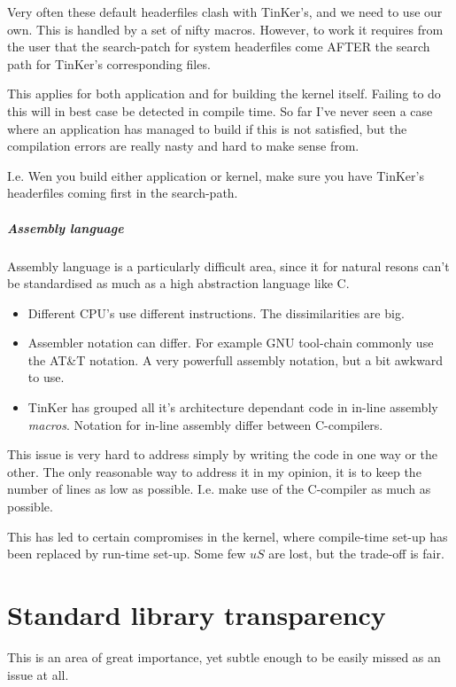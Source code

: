Very often these default headerfiles clash with TinKer's, and we need to use our own. This is handled by a set of nifty macros. However, to work it requires from the user that the search-patch for system headerfiles come AFTER the search path for TinKer's corresponding files. 

This applies for both application and for building the kernel itself. Failing to do this will in best case be detected in compile time. So far I've never seen a case where an application has managed to build if this is not satisfied, but the compilation errors are really nasty and hard to make sense from.

I.e. Wen you build either application or kernel, make sure you have TinKer's headerfiles coming first in the search-path.

\paragraph{Assembly language}
Assembly language is a particularly difficult area, since it for natural resons can't be standardised as much as a high abstraction language like C.

\begin{itemize}
	\item Different CPU's use different instructions. The dissimilarities are big.
	\item Assembler notation can differ. For example GNU tool-chain commonly use the AT\&T notation. A very powerfull assembly notation, but a bit awkward to use.
	\item TinKer has grouped all it's architecture dependant code in in-line assembly \textit{macros}. Notation for in-line assembly differ between C-compilers.
\end{itemize}
This issue is very hard to address simply by writing the code in one way or the other. The only reasonable way to address it in my opinion, it is to keep the number of lines as low as possible. I.e. make use of the C-compiler as much as possible.

This has led to certain compromises in the kernel, where compile-time set-up has been replaced by run-time set-up. Some few $uS$ are lost, but the trade-off is fair.


\chapter{Standard library transparency}
This is an area of great importance, yet subtle enough to be easily missed as an issue at all.

